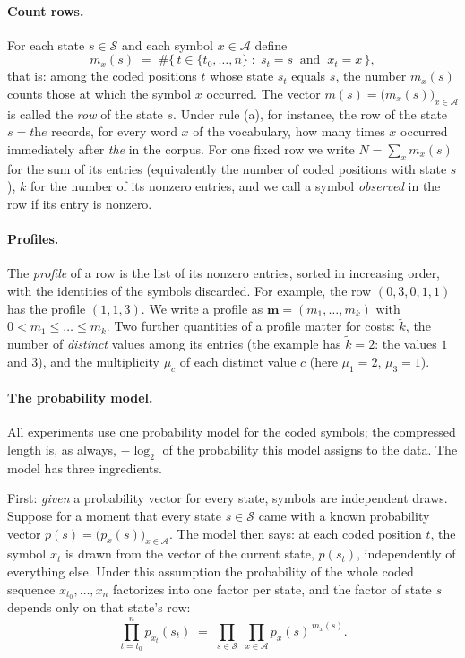 \documentclass[11pt]{article}
\newcommand{\prof}{\mathbf{m}}
\newcommand{\field}[1]{\paragraph{#1.}}
\begin{document}
\field{Count rows}
For each state $s \in \mathcal{S}$ and each symbol
$x \in \mathcal{A}$ define
\[
  m_x(s) \;=\; \#\bigl\{\, t \in \{t_0, \dots, n\}
  \;:\; s_t = s \ \text{ and }\ x_t = x \,\bigr\},
\]
that is: among the coded positions $t$ whose state $s_t$ equals $s$,
the number $m_x(s)$ counts those at which the symbol $x$ occurred.
The vector $m(s) = \bigl(m_x(s)\bigr)_{x \in \mathcal{A}}$ is
called the \emph{row} of the state $s$.  Under rule (a), for
instance, the row of the state $s = \textit{the}$ records, for
every word $x$ of the vocabulary, how many times $x$ occurred
immediately after \emph{the} in the corpus.  For one fixed row we
write $N = \sum_{x} m_x(s)$ for the sum of its entries (equivalently
the number of coded positions with state $s$), $k$ for the number of
its nonzero entries, and we call a symbol \emph{observed} in the row
if its entry is nonzero.

\field{Profiles}
The \emph{profile} of a row is the list of its nonzero entries,
sorted in increasing order, with the identities of the symbols
discarded.  For example, the row $(0, 3, 0, 1, 1)$ has the profile
$(1, 1, 3)$.  We write a profile as $\prof = (m_1, \dots, m_k)$ with
$0 < m_1 \le \dots \le m_k$.  Two further quantities of a profile
matter for costs: $\tilde k$, the number of \emph{distinct} values
among its entries (the example has $\tilde k = 2$: the values $1$
and $3$), and the multiplicity $\mu_c$ of each distinct value $c$
(here $\mu_1 = 2$, $\mu_3 = 1$).

\field{The probability model}
All experiments use one probability model for the coded symbols; the
compressed length is, as always, $-\log_2$ of the probability this
model assigns to the data.  The model has three ingredients.

First: \emph{given} a probability vector for every state, symbols
are independent draws.  Suppose for a moment that every state $s \in
\mathcal{S}$ came with a known probability vector $p(s) =
\bigl(p_x(s)\bigr)_{x \in \mathcal{A}}$.  The model then says:
at each coded position $t$, the symbol $x_t$ is drawn from the
vector of the current state, $p(s_t)$, independently of everything
else.  Under this assumption the probability of the whole coded
sequence $x_{t_0}, \dots, x_n$ factorizes into one factor per
state, and the factor of state $s$ depends only on that state's
row:
\begin{equation}
  \prod_{t = t_0}^{n} p_{x_t}(s_t)
  \;=\; \prod_{s \in \mathcal{S}}\;
  \prod_{x \in \mathcal{A}} p_x(s)^{\,m_x(s)} .
  \label{eq:factorize}
\end{equation}
\end{document}
